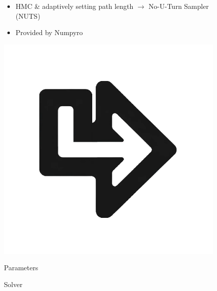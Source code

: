 \documentclass{beamer}
\begin{document}
\begin{frame}
\begin{figure}[htbp]
\begin{minipage}[c][0.35\paperheight][c]{\linewidth}
\begin{minipage}{0.58\linewidth}
{\begin{itemize}
					\item HMC \& adaptively setting path length $\rightarrow$ No-U-Turn Sampler (NUTS)
					\item Provided by Numpyro
			\end{itemize}}
			\end{minipage}
			\begin{minipage}{0.1\linewidth}
				\includegraphics[angle=180, width=\linewidth]{images/left_turn_arrow.eps}
			\end{minipage}
		\end{minipage}
		\begin{minipage}[t][0.06\paperheight][t]{\linewidth}
			\begin{minipage}{0.19\linewidth}
				\caption*{\tiny Parameters}
			\end{minipage}
			\begin{minipage}{0.1\linewidth}
				\caption*{\tiny}
			\end{minipage}
			\begin{minipage}{0.19\linewidth}
				\caption*{\tiny Solver}
			\end{minipage}
			\begin{minipage}{0.1\linewidth}
				\caption*{\tiny}
			\end{minipage}
			\begin{minipage}{0.19\linewidth}

\end{minipage}
\end{minipage}
\end{figure}
\end{frame}
\end{document}
